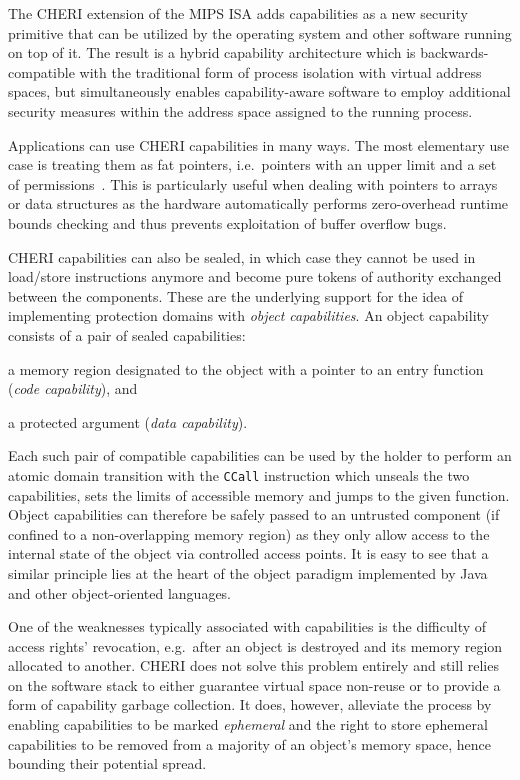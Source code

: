 \documentclass[a4paper,12pt,twoside,openright]{report}
\newcommand{\insn}[1]{\texttt{#1}}
\begin{document}
The CHERI extension of the MIPS ISA adds capabilities as a new security primitive that can be utilized by the operating system and other software running on top of it. The result is a hybrid capability architecture which is backwards-compatible with the traditional form of process isolation with virtual address spaces, but simultaneously enables capability-aware software to employ additional security measures within the address space assigned to the running process.

Applications can use CHERI capabilities in many ways. The most elementary use case is treating them as fat pointers, i.e.\ pointers with an upper limit and a set of permissions~\cite{kwon2013low}. This is particularly useful when dealing with pointers to arrays or data structures as the hardware automatically performs zero-overhead runtime bounds checking and thus prevents exploitation of buffer overflow bugs. 

CHERI capabilities can also be sealed, in which case they cannot be used in load/store instructions anymore and become pure tokens of authority exchanged between the components. These are the underlying support for the idea of implementing protection domains with \emph{object capabilities}. An object capability consists of a pair of sealed capabilities: 
\begin{inparaenum}
\item a memory region designated to the object with a pointer to an entry function (\emph{code capability}), and
\item a protected argument (\emph{data capability}).
\end{inparaenum}
Each such pair of compatible capabilities can be used by the holder to perform an atomic domain transition with the \insn{CCall} instruction which unseals the two capabilities, sets the limits of accessible memory and jumps to the given function. Object capabilities can therefore be safely passed to an untrusted component (if confined to a non-overlapping memory region) as they only allow access to the internal state of the object via controlled access points. It is easy to see that a similar principle lies at the heart of the object paradigm implemented by Java and other object-oriented languages.

One of the weaknesses typically associated with capabilities is the difficulty of access rights' revocation, e.g.\ after an object is destroyed and its memory region allocated to another. CHERI does not solve this problem entirely and still relies on the software stack to either guarantee virtual space non-reuse or to provide a form of capability garbage collection. It does, however, alleviate the process by enabling capabilities to be marked \emph{ephemeral} and the right to store ephemeral capabilities to be removed from a majority of an object's memory space, hence bounding their potential spread.
\end{document}
